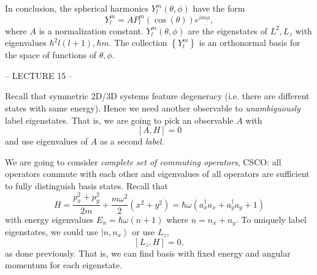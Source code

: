 \documentclass[phys334]{subfiles}
\begin{document}
    In conclusion, the spherical harmonics $Y_l^m\left( \theta,\phi \right)$ have the form
    \begin{equation*}
        Y_l^m = A P_l^m\left( \cos\left( \theta \right) \right)e^{im\phi},
    \end{equation*}
    where $A$ is a normalization constant. $Y_l^m\left( \theta,\phi \right)$ are the eigenstates of $L^{2},L_z$ with eigenvalues $\hbar^{2}l\left( l+1 \right),\hbar m$. The collection $\left\lbrace Y_l^m \right\rbrace$ is an orthonormal basis for the space of functions of $\theta,\phi$.

    \clearpage

    -- LECTURE 15 --

    \clearpage
    
    \np Recall that symmetric 2D/3D systems feature degeneracy (i.e. there are different states with same energy). Hence we need another observable to \textit{unambiguously} label eigenstates. That is, we are going to pick an observable $A$ with
    \begin{equation*}
        \left[ A,H \right] = 0
    \end{equation*}
    and use eigenvalues of $A$ as a second \textit{label}.

    \np We are going to consider \textit{complete set of commuting operators}, CSCO: all operators commute with each other and eigenvalues of all operators are sufficient to fully distinguish basis states. Recall that
    \begin{equation*}
        H = \frac{p_x^{2}+p_y^{2}}{2m} + \frac{m\omega^{2}}{2}\left( x^{2}+y^{2} \right) = \hbar\omega\left( a^{\dagger}_xa_x + a_y^{\dagger}a_y + 1 \right)
    \end{equation*}
    with energy eigenvalues $E_n = \hbar\omega\left( n+1 \right)$ where $n=n_x+n_y$. To uniquely label eigenstates, we could use $\left| n,n_x \right\rangle$ or use $L_z$,
    \begin{equation*}
        \left[ L_z,H \right] = 0,
    \end{equation*}
    as done previously. That is, we can find basis with fixed energy and angular momentum for each eigenstate.
\end{document}
